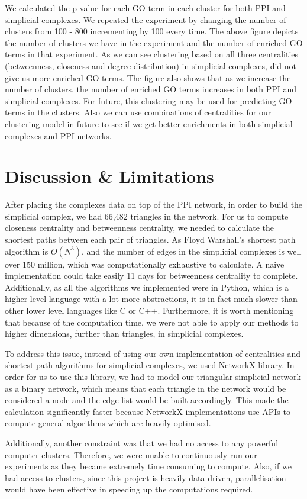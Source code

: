 \documentclass[9pt]{article}
\begin{document}
\par 
We calculated the p value for each GO term in each cluster for both PPI and simplicial complexes. We repeated the experiment by changing the number of clusters from 100 - 800 incrementing by 100 every time. The above figure depicts the number of clusters we have in the experiment and the number of enriched GO terms in that experiment. As we can see clustering based on all three centralities (betweenness, closeness and degree distribution) in simplicial complexes, did not give us more enriched GO terms. The figure also shows that as we increase the number of clusters, the number of enriched GO terms increases in both PPI and simplicial complexes. For future, this clustering may be used for predicting GO terms in the clusters. Also
we can use combinations of centralities for our clustering model in future to see if we get better enrichments in both simplicial complexes and PPI networks.

\section{Discussion \& Limitations} 
After placing the complexes data on top of the PPI network, in order to build the simplicial complex, we had 66,482 triangles in the network. For us to compute closeness centrality and betweenness centrality, we needed to calculate the shortest paths between each pair of triangles. As Floyd Warshall’s shortest path algorithm is \(O(N^3)\), and the number of edges in the simplicial complexes is well over 150 million, which was computationally exhaustive to calculate. A naive implementation could take easily 11 days for betweenness centrality to complete. Additionally, as all the algorithms we implemented were in Python, which is a higher level language with a lot more abstractions, it is in fact much slower than other lower level languages like C or C++. Furthermore, it is worth mentioning that because of the computation time, we were not able to apply our methods to higher dimensions, further than triangles, in simplicial complexes.
\par
To address this issue, instead of using our own implementation of centralities and shortest path algorithms for simplicial complexes, we used NetworkX library. In order for us to use this library, we had to model our triangular simplicial network as a binary network, which means that each triangle in the network would be considered a node and the edge list would be built accordingly. This made the calculation significantly faster because NetworkX implementations use APIs to compute general algorithms which are heavily optimised.
\par
Additionally, another constraint was that we had no access to any powerful computer clusters. Therefore, we were unable to continuously run our experiments as they became extremely time consuming to compute. Also, if we had access to clusters, since this project is heavily data-driven, parallelisation would have been effective in speeding up the computations required.  
\end{document}
